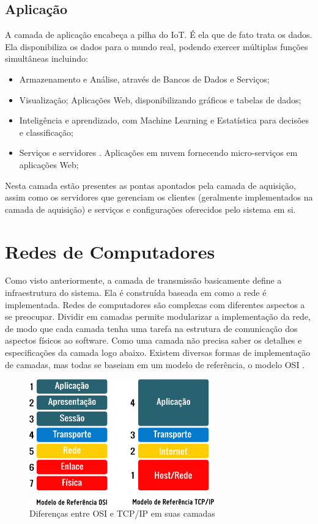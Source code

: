 \subsection{Aplicação}
\label{subsection:aplicacao}

A camada de aplicação encabeça a pilha do IoT. É ela que de fato trata os dados. Ela disponibiliza os dados para o mundo real, podendo exercer múltiplas funções simultâneas incluindo:

\begin{itemize}
\item Armazenamento e Análise, através de Bancos de Dados e Serviços;
\item Visualização; Aplicações Web, disponibilizando gráficos e tabelas de dados;
\item Inteligência e aprendizado, com Machine Learning e Estatística para decisões e classificação;
\item Serviços e servidores . Aplicações em nuvem fornecendo micro-serviços em aplicações Web;
\end{itemize}

Nesta camada estão presentes as pontas apontados pela camada de aquisição, assim como os servidores que gerenciam os clientes (geralmente implementados na camada de aquisição) e serviços e configurações oferecidos pelo sistema em si.

\section{Redes de Computadores}
\label{section:camadas_de_rede}

Como visto anteriormente, a camada de transmissão basicamente define a infraestrutura do sistema. Ela é construída baseada em como a rede é implementada. Redes de computadores são complexas com diferentes aspectos a se preocupar. Dividir em camadas permite modularizar a implementação da rede, de modo que cada camada tenha uma tarefa na estrutura de comunicação dos aspectos físicos ao software. Como uma camada  não precisa saber os detalhes e especificações da camada logo abaixo. Existem diversas formas de implementação de camadas, mas todas se baseiam em um modelo de referência, o modelo OSI \cite{Zimmermann:1988:ORM:59309.59310}.


\begin{figure}[h!]
\centering
\includegraphics[width=8cm]{./02_Capitulos/02_Cap1/figures/modelo_osi_tcpip}
\caption{Diferenças entre OSI e TCP/IP em suas camadas}
\label{fig:1.2.0/modelo_osi_tcpip}
\end{figure}

